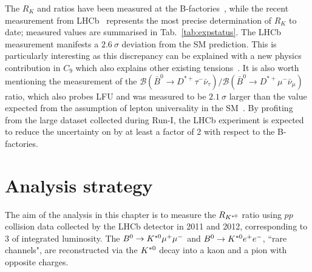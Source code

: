 The $R_K$ and \RKst ratios have been measured at the B-factories~\cite{Lees:2012tva,Wei:2009zv},
while the recent measurement from LHCb~\cite{Aaij:2014ora} represents the most precise determination 
of $R_K$ to date; measured values are summarised in Tab.~\ref{tab:expstatus}.
The LHCb measurement manifests a $2.6~\sigma$ deviation from the SM prediction. This is particularly interesting as this
discrepancy can be explained with a new physics contribution in $C_9$ which also explains other existing tensions~\cite{Altmannshofer:2014rta,Descotes-Genon:2013wba,Hurth:2016fbr}.
It is also worth mentioning the measurement of the 
\mbox{$\mathcal{B}(\bar{B}^0 \to D^{*+}\tau^{-}\bar{\nu}_{\tau})/\mathcal{B}(\bar{B}^0 \to D^{*+}\mu^{-}\bar{\nu}_{\mu})$} 
ratio, which also probes LFU and was measured to be $2.1~\sigma$ larger than the value expected from the assumption 
of lepton universality in the SM~\cite{Aaij:2015yra}.
By profiting from the large dataset collected during Run-I, the LHCb experiment is expected 
to reduce the uncertainty on \RKst by at least a factor of 2 with respect to the B-factories.
%
\begin{table}[b]
\renewcommand\arraystretch{1.5}
\centering
\caption{Experimental status of the $R_{K^{(*)}}$ measurements. } %
\label{tab:expstatus}
\end{table}
\clearpage

\section{Analysis strategy}

The aim of the analysis in this chapter is to measure the $R_{{{K}^{*0}}}$ ratio using $pp$ collision data
collected by the LHCb detector in 2011 and 2012, corresponding to 3 \invfb of integrated luminosity.
The ${{B}^0} \rightarrow {\ensuremath{{K}^{*0}}}{\ensuremath{\mu^+\mu^-}}$ and ${{B}^0} \rightarrow {\ensuremath{{K}^{*0}}}{\ensuremath{e^+e^-}}$, ``rare channels", are
reconstructed via the ${{K}^{*0}}$ decay into a kaon and a pion with opposite charges.

